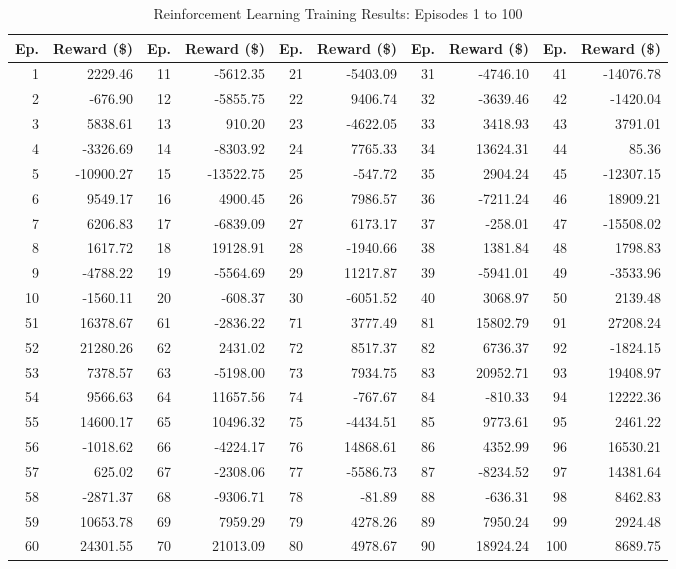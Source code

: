 \begin{table}[h]
\centering
\caption{Reinforcement Learning Training Results: Episodes 1 to 100}
\label{tab:rl_results_full}
\scriptsize
\begin{tabular}{rrrrrrrrrr}
\toprule
\textbf{Ep.} & \textbf{Reward (\$)} & \textbf{Ep.} & \textbf{Reward (\$)} & \textbf{Ep.} & \textbf{Reward (\$)} & \textbf{Ep.} & \textbf{Reward (\$)} & \textbf{Ep.} & \textbf{Reward (\$)} \\
\midrule
1 & 2229.46 & 11 & -5612.35 & 21 & -5403.09 & 31 & -4746.10 & 41 & -14076.78 \\
2 & -676.90 & 12 & -5855.75 & 22 & 9406.74 & 32 & -3639.46 & 42 & -1420.04 \\
3 & 5838.61 & 13 & 910.20 & 23 & -4622.05 & 33 & 3418.93 & 43 & 3791.01 \\
4 & -3326.69 & 14 & -8303.92 & 24 & 7765.33 & 34 & 13624.31 & 44 & 85.36 \\
5 & -10900.27 & 15 & -13522.75 & 25 & -547.72 & 35 & 2904.24 & 45 & -12307.15 \\
6 & 9549.17 & 16 & 4900.45 & 26 & 7986.57 & 36 & -7211.24 & 46 & 18909.21 \\
7 & 6206.83 & 17 & -6839.09 & 27 & 6173.17 & 37 & -258.01 & 47 & -15508.02 \\
8 & 1617.72 & 18 & 19128.91 & 28 & -1940.66 & 38 & 1381.84 & 48 & 1798.83 \\
9 & -4788.22 & 19 & -5564.69 & 29 & 11217.87 & 39 & -5941.01 & 49 & -3533.96 \\
10 & -1560.11 & 20 & -608.37 & 30 & -6051.52 & 40 & 3068.97 & 50 & 2139.48 \\
\midrule
51 & 16378.67 & 61 & -2836.22 & 71 & 3777.49 & 81 & 15802.79 & 91 & 27208.24 \\
52 & 21280.26 & 62 & 2431.02 & 72 & 8517.37 & 82 & 6736.37 & 92 & -1824.15 \\
53 & 7378.57 & 63 & -5198.00 & 73 & 7934.75 & 83 & 20952.71 & 93 & 19408.97 \\
54 & 9566.63 & 64 & 11657.56 & 74 & -767.67 & 84 & -810.33 & 94 & 12222.36 \\
55 & 14600.17 & 65 & 10496.32 & 75 & -4434.51 & 85 & 9773.61 & 95 & 2461.22 \\
56 & -1018.62 & 66 & -4224.17 & 76 & 14868.61 & 86 & 4352.99 & 96 & 16530.21 \\
57 & 625.02 & 67 & -2308.06 & 77 & -5586.73 & 87 & -8234.52 & 97 & 14381.64 \\
58 & -2871.37 & 68 & -9306.71 & 78 & -81.89 & 88 & -636.31 & 98 & 8462.83 \\
59 & 10653.78 & 69 & 7959.29 & 79 & 4278.26 & 89 & 7950.24 & 99 & 2924.48 \\
60 & 24301.55 & 70 & 21013.09 & 80 & 4978.67 & 90 & 18924.24 & 100 & 8689.75 \\
\bottomrule
\end{tabular}
\end{table}


